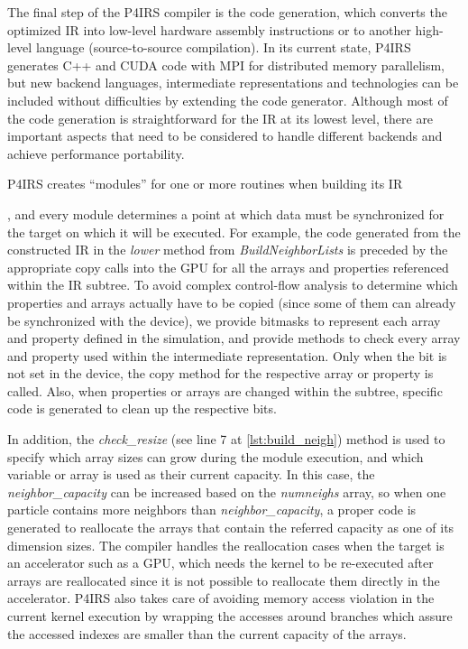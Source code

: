 \documentclass[Afour,sageh,times]{sagej}
\newcommand{\RMchange}[1]{{\color{blue} #1}}
\begin{document}
\RMchange{
The final step of the P4IRS compiler is the code generation, which converts the optimized \ac{IR} into low-level hardware assembly instructions or to another high-level language (source-to-source compilation).
In its current state, P4IRS generates C++ and CUDA code with MPI for distributed memory parallelism, but new backend languages, intermediate representations and technologies can be included without difficulties by extending the code generator.
Although most of the code generation is straightforward for the \ac{IR} at its lowest level, there are important aspects that need to be considered to handle different backends and achieve performance portability.

P4IRS creates ``modules'' for one or more routines when building its IR}, and every module determines a point \RMchange{at which data must be synchronized for the target on which it will be executed.}
For example, the code generated from the constructed IR in the \emph{lower} method from \emph{BuildNeighborLists} is preceded by the appropriate copy calls into the GPU for all the arrays and properties \RMchange{referenced} within the IR subtree.
To avoid complex control-flow analysis to determine which properties and arrays actually have to be copied (since some of them can already be synchronized with the device), we provide bitmasks to represent each array and property defined in the simulation, and provide methods to check every array and property used within the intermediate representation.
Only when the bit is not set in the device, the copy method for the respective array or property is called.
Also, when properties or arrays are changed within the subtree, specific code is generated to clean up the respective bits.

\RMchange{In addition,} the \emph{check\_resize} (see line 7 at \autoref{lst:build_neigh}) method is used to specify which array sizes can grow during the module execution, and which variable or array is used as their current capacity.
In this case, the \emph{neighbor\_capacity} can be increased based on the \emph{numneighs} array, so when one particle contains more neighbors than \emph{neighbor\_capacity}, a proper code is generated to reallocate the arrays that contain the referred capacity as one of its dimension sizes.
The compiler handles the reallocation cases when the target is an accelerator such as a GPU, which needs the kernel to be re-executed after arrays are reallocated since it is not possible to reallocate them directly in the accelerator.
P4IRS also takes care of avoiding memory access violation in the current kernel execution by wrapping the accesses around branches which assure the accessed indexes are smaller than the current capacity of the arrays.
\end{document}
